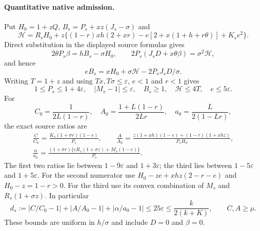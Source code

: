 \documentclass[11pt]{article}
\begin{document}
\paragraph{Quantitative native admission.}
Put $H_0=1+zQ$, $B_s=P_s+xz(J_s-\sigma)$ and
\[
 \mathcal H=R_sH_0+z\{(1-r)xh(2+xr)
                      -e[2+x(1+h+r\theta)]+K_se^2\}.
\]
Direct substitution in the displayed source formulas gives
\[
 2\theta P_s\beta=hB_s-\sigma H_0,\qquad
 2P_s(J_sD+x\theta\beta)=\sigma^2\mathcal H,
\]
and hence
\[
 eB_s=xH_0+\sigma\mathcal H-2P_sJ_sD/\sigma.
\]
Writing $T=1+z$ and using $Tx,T\sigma\le\varepsilon$,
$e<1$ and $r<1$ gives
\[
 1\le P_s\le1+4\varepsilon,\quad |M_s-1|\le\varepsilon,
 \quad B_s\ge1,\quad\mathcal H\le4T,
 \quad e\le5\varepsilon.
\]
For
\[
 C_0=\frac1{2L(1-r)},\quad
 A_0=\frac{1+L(1-r)}{2Lr},\quad
 a_0=\frac L{2(1-Lr)},
\]
the exact source ratios are
\begin{gather*}
 \frac C{C_0}=\frac{K_s(1+\sigma r)(1-e)}{P_s},\qquad
 \frac A{A_0}=\frac{z(1+xh)(1-e)+(1-r)(1+xhz)}{P_sH_0},\\
 \frac\alpha{a_0}=
 \frac{(1+\sigma r)\{eR_s(1+\sigma z)+M_s(1-e)\}}{P_s}.
\end{gather*}
The first two ratios lie between $1-9\varepsilon$ and
$1+3\varepsilon$; the third lies between $1-5\varepsilon$
and $1+5\varepsilon$. For the second numerator use
$H_0-ze+xhz(2-r-e)$ and $H_0-z=1-r>0$.
For the third use its convex combination of $M_s$ and
$R_s(1+\sigma z)$. In particular
\begin{equation}\label{eq:source-admit}
 d_s:=|C/C_0-1|+|A/A_0-1|+|\alpha/a_0-1|
 \le25\varepsilon\le\frac{k}{2(k+K)},\qquad C,A\ge\mu.
\end{equation}
These bounds are uniform in $h/\sigma$ and include $D=0$ and $\beta=0$.
\end{document}
